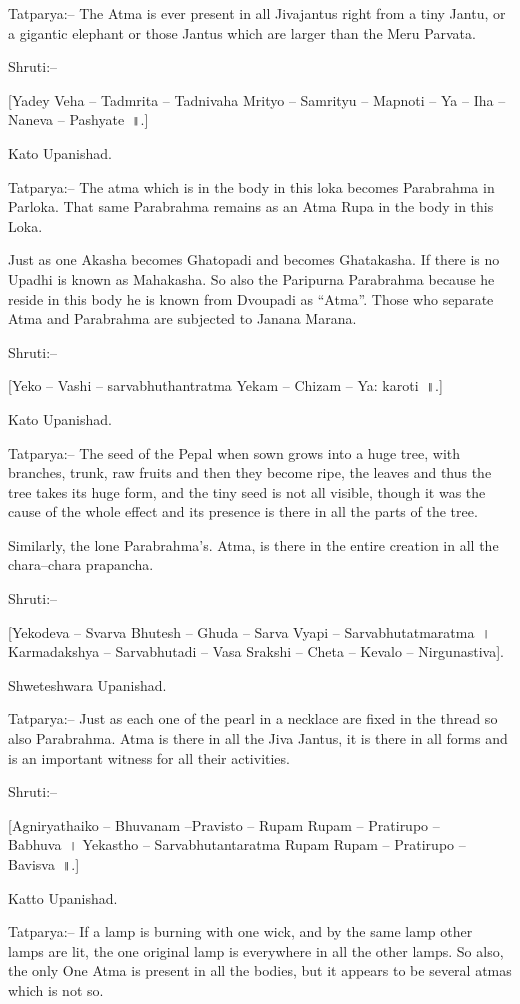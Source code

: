 Tatparya:– The Atma is ever present in all Jivajantus right from a tiny Jantu, or a gigantic elephant or those Jantus which are larger than the Meru Parvata.

Shruti:–

[Yadey Veha – Tadmrita – Tadnivaha Mrityo – Samrityu – Mapnoti – Ya – Iha – Naneva – Pashyate~॥.]

Kato Upanishad.

Tatparya:– The atma which is in the body in this loka becomes Parabrahma in Parloka. That same Parabrahma remains as an Atma Rupa in the body in this Loka.

Just as one Akasha becomes Ghatopadi and becomes Ghatakasha. If there is no Upadhi is known as Mahakasha. So also the Paripurna Parabrahma because he reside in this body he is known from Dvoupadi as “Atma”. Those who separate Atma and Parabrahma are subjected to Janana Marana.

Shruti:–

[Yeko – Vashi – sarvabhuthantratma Yekam – Chizam – Ya: karoti~॥.]

Kato Upanishad.

Tatparya:– The seed of the Pepal when sown grows into a huge tree, with branches, trunk, raw fruits and then they become ripe, the leaves and thus the tree takes its huge form, and the tiny seed is not all visible, though it was the cause of the whole effect and its presence is there in all the parts of the tree.

Similarly, the lone Parabrahma's. Atma, is there in the entire creation in all the chara–chara prapancha.

Shruti:–

[Yekodeva – Svarva Bhutesh – Ghuda – Sarva Vyapi – Sarvabhutatmaratma~। Karmadakshya – Sarvabhutadi – Vasa Srakshi – Cheta – Kevalo – Nirgunastiva].

Shweteshwara Upanishad.

Tatparya:– Just as each one of the pearl in a necklace are fixed in the thread so also Parabrahma. Atma is there in all the Jiva Jantus, it is there in all forms and is an important witness for all their activities.

Shruti:–

[Agniryathaiko – Bhuvanam –Pravisto – Rupam Rupam – Pratirupo – Babhuva~। Yekastho – Sarvabhutantaratma Rupam Rupam – Pratirupo – Bavisva~॥.]

Katto Upanishad.

Tatparya:– If a lamp is burning with one wick, and by the same lamp other lamps are lit, the one original lamp is everywhere in all the other lamps. So also, the only One Atma is present in all the bodies, but it appears to be several atmas which is not so.


